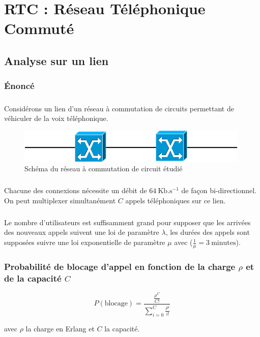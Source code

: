 %
\chapter{RTC : Réseau Téléphonique Commuté}
%
%
    \section{Analyse sur un lien}
        \label{seullien} %
%
        \subsection{Énoncé}
%
            \paragraph{}
Considérons un lien d'un réseau à commutation de circuits permettant de véhiculer de la voix téléphonique.
%
            \begin{figure}[h]
                \centering
                \includegraphics[scale=0.7]{RSC/1-1.png}
                \caption{ Schéma du réseau à commutation de circuit étudié }
                \label{ Schema du reseau a commutation de circuit }
            \end{figure}
%
            \paragraph{}
Chacune des connexions nécessite un débit de $64 \ \text{Kb}.\text{s}^{-1}$ de façon bi-directionnel.
On peut multiplexer simultanément $C$ appels téléphoniques sur ce lien.
%
            \paragraph{}
Le nombre d'utilisateurs est suffisamment grand pour supposer que les arrivées des nouveaux appels suivent une loi de paramètre $\lambda$, les durées des appels sont supposées suivre une loi exponentielle de paramètre $\mu$ avec ($\frac{1}{\mu} = 3 \ \text{minutes}$).
%
%
\clearpage
%
%
        \subsection{Probabilité de blocage d'appel en fonction de la charge $\rho$ et de la capacité $C$}
%
            \[ P(\text{blocage}) = \frac{ \frac{ \rho^C }{ C! } }{ \sum\limits_{i=0}^C \frac{ \rho^i }{ i! } } \]
%
            \begin{center}
                avec $\rho$ la charge en Erlang et $C$ la capacité.
            \end{center}
%
